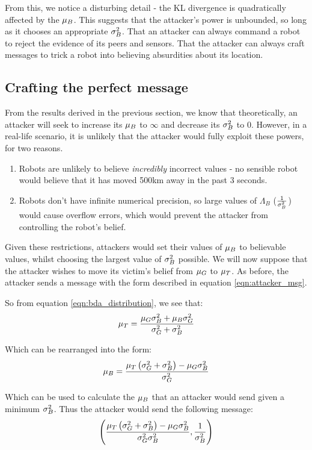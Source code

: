 From this, we notice a disturbing detail - the KL divergence is quadratically affected by the $\mu_B$. This suggests that the attacker's power is unbounded, so long as it chooses an appropriate $\sigma_B^2$. That an attacker can always command a robot to reject the evidence of its peers and sensors. That the attacker can always craft messages to trick a robot into believing absurdities about its location.

\subsection{Crafting the perfect message}
From the results derived in the previous section, we know that theoretically, an attacker will seek to increase its $\mu_B$ to $\infty$ and decrease its $\sigma_B^2$ to 0. However, in a real-life scenario, it is unlikely that the attacker would fully exploit these powers, for two reasons.
\begin{enumerate}
	\item Robots are unlikely to believe \textit{incredibly} incorrect values - no sensible robot would believe that it has moved 500km away in the past 3 seconds.
	\item Robots don't have infinite numerical precision, so large values of $\Lambda_B$ ($\frac{1}{\sigma_B^2}$) would cause overflow errors, which would prevent the attacker from controlling the robot's belief.
\end{enumerate}

Given these restrictions, attackers would set their values of $\mu_B$ to believable values, whilst choosing the largest value of $\sigma_B^2$ possible. 
We will now suppose that the attacker wishes to move its victim's belief from $\mu_G$ to $\mu_T$. 
As before, the attacker sends a message with the form described in equation \ref{eqn:attacker_msg}.

So from equation \ref{eqn:bda_distribution}, we see that:
\begin{equation}
	\mu_T = \frac{\mu_G\sigma_B^2 + \mu_B\sigma_G^2}{\sigma_G^2 + \sigma_B^2}
\end{equation}

Which can be rearranged into the form:
\begin{equation}
	\mu_B = \frac{\mu_T\left(\sigma_G^2 + \sigma_B^2\right) - \mu_G\sigma_B^2}{\sigma_G^2}
\end{equation}

Which can be used to calculate the $\mu_B$ that an attacker would send given a minimum $\sigma_B^2$. 
Thus the attacker would send the following message:
\begin{equation}
	\left(\frac{\mu_T\left(\sigma_G^2 + \sigma_B^2\right) - \mu_G\sigma_B^2}{\sigma_G^2\sigma_B^2}, \frac{1}{\sigma_B^2}\right)
\end{equation}

